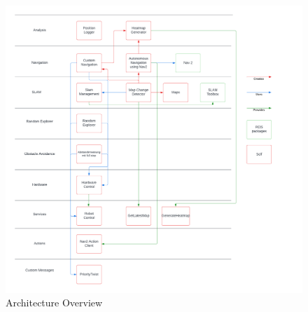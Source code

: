 \documentclass[]{article}
\begin{document}
			
	\begin{figure}[ht]
		\begin{flushleft}
		\includegraphics[width=1.1\textwidth]{Graphics/ArchitectureOverview}
		\caption{Architecture Overview}
		\label{fig: fig8}
		\end{flushleft}
	\end{figure}
	
	
	
	\newpage

	
\end{document}
